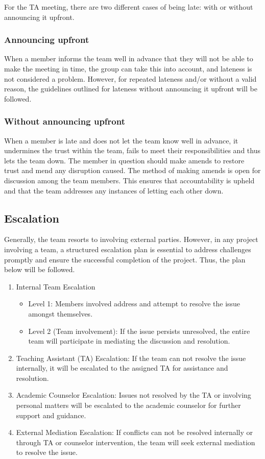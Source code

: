 \documentclass[sigconf,nonacm]{acmart}
\begin{document}
For the TA meeting, there are two different cases of being late: with or without announcing it upfront.

\subsubsection{Announcing upfront}
When a member informs the team well in advance that they will not be able to make the meeting in time, the group can take this into account, and lateness is not considered a problem. However, for repeated lateness and/or without a valid reason, the guidelines outlined for lateness without announcing it upfront will be followed.

\subsubsection{Without announcing upfront}
When a member is late and does not let the team know well in advance, it undermines the trust within the team, fails to meet their responsibilities and thus lets the team down. The member in question should make amends to restore trust and mend any disruption caused. The method of making amends is open for discussion among the team members. This ensures that accountability is upheld and that the team addresses any instances of letting each other down.

\subsection{Escalation}
Generally, the team resorts to involving external parties. However, in any project involving a team, a structured escalation plan is essential to address challenges promptly and ensure the successful completion of the project. Thus, the plan below will be followed.

\begin{enumerate}
    \item Internal Team Escalation
    \begin{itemize}
        \item Level 1: Members involved address and attempt to resolve the issue amongst themselves.
        \item Level 2 (Team involvement): If the issue persists unresolved, the entire team will participate in mediating the discussion and resolution.
    \end{itemize}
    \item Teaching Assistant (TA) Escalation: If the team can not resolve the issue internally, it will be escalated to the assigned TA for assistance and resolution.
    \item Academic Counselor Escalation: Issues not resolved by the TA or involving personal matters will be escalated to the academic counselor for further support and guidance.
    \item External Mediation Escalation: If conflicts can not be resolved internally or through TA or counselor intervention, the team will seek external mediation to resolve the issue.
\end{enumerate}
\end{document}
